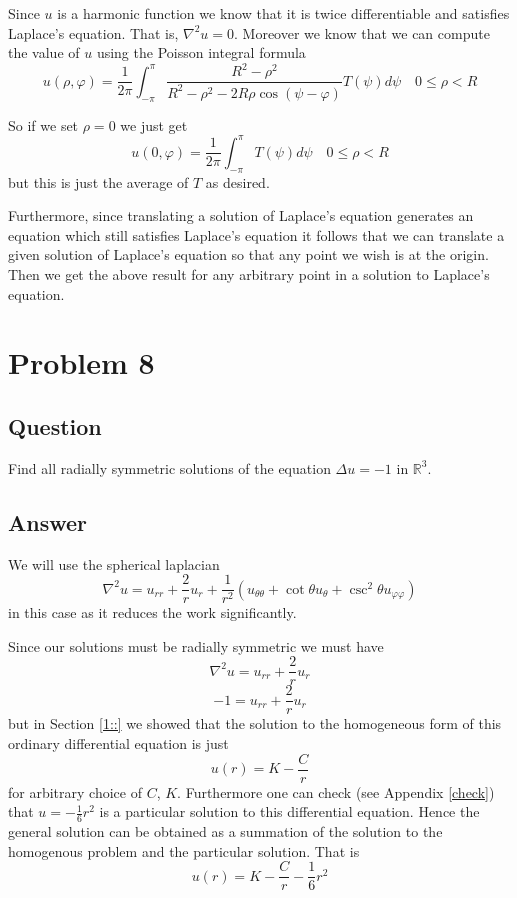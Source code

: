 \documentclass[12pt]{article}
\begin{document}
Since $u$ is a harmonic function we know that it is twice differentiable and satisfies Laplace's equation. That is, $\nabla^2 u = 0$. Moreover we know that we can compute the value of $u$ using the Poisson integral formula \cite[Page 180]{pinsky} 
\[u(\rho , \varphi) = \frac{1}{2 \pi} \int_{-\pi}^\pi \frac{R^2-\rho^2}{R^2-\rho^2-2R\rho\cos{(\psi - \varphi)}} T(\psi)d \psi \quad 0 \leq \rho < R\]

So if we set $\rho=0$ we just get
\[u(0 , \varphi) = \frac{1}{2 \pi} \int_{-\pi}^\pi T(\psi)d \psi \quad 0 \leq \rho < R\]
but this is just the average of $T$ as desired.

Furthermore, since translating a solution of Laplace's equation generates an equation which still satisfies Laplace's equation it follows that we can translate a given solution of Laplace's equation so that any point we wish is at the origin. Then we get the above result for any arbitrary point in a solution to Laplace's equation.


\section{Problem 8}
\subsection{Question}
Find all radially symmetric solutions of the equation $\Delta u = -1$ in $\mathbb{R}^3$.

\subsection{Answer}

We will use the spherical laplacian
\[\nabla^2 u = u_{rr} +\frac{2}{r} u_r+ \frac{1}{r^2} \left( u_{\theta \theta} +\cot{\theta} u_\theta  +  \csc^2{\theta} u_{\varphi \varphi} \right)\]
in this case as it reduces the work significantly. 

Since our solutions must be radially symmetric we must have
\[\nabla^2 u = u_{rr} +\frac{2}{r} u_r \]
\[-1 = u_{rr} +\frac{2}{r} u_r \]
but in Section \ref{1::} we showed that the solution to the homogeneous form of this ordinary differential equation is just
\[u(r)=K-\frac{C}{r}\]
for arbitrary choice of $C$, $K$. Furthermore one can check (see Appendix \ref{check}) that $u=-\frac{1}{6}r^2$ is a particular solution to this differential equation. Hence the general solution can be obtained as a summation of the solution to the homogenous problem and the particular solution. That is
\[u(r)=K-\frac{C}{r}-\frac{1}{6}r^2\]
\end{document}
